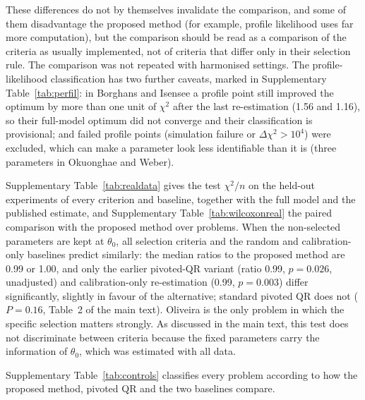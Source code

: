 These differences do not by themselves invalidate the comparison, and some of them disadvantage the proposed method (for example, profile likelihood uses far more computation), but the comparison should be read as a comparison of the criteria as usually implemented, not of criteria that differ only in their selection rule. The comparison was not repeated with harmonised settings. The profile-likelihood classification has two further caveats, marked in Supplementary Table~\ref{tab:perfil}: in Borghans and Isensee a profile point still improved the optimum by more than one unit of $\chi^2$ after the last re-estimation (1.56 and 1.16), so their full-model optimum did not converge and their classification is provisional; and failed profile points (simulation failure or $\Delta\chi^2>10^4$) were excluded, which can make a parameter look less identifiable than it is (three parameters in Okuonghae and Weber).

{\scriptsize\setlength{\tabcolsep}{3pt}

}


Supplementary Table~\ref{tab:realdata} gives the test $\chi^2/n$ on the held-out experiments of every criterion and baseline, together with the full model and the published estimate, and Supplementary Table~\ref{tab:wilcoxonreal} the paired comparison with the proposed method over problems. When the non-selected parameters are kept at $\theta_0$, all selection criteria and the random and calibration-only baselines predict similarly: the median ratios to the proposed method are 0.99 or 1.00, and only the earlier pivoted-QR variant (ratio 0.99, $p=0.026$, unadjusted) and calibration-only re-estimation (0.99, $p=0.003$) differ significantly, slightly in favour of the alternative; standard pivoted QR does not ($P=0.16$, Table~2 of the main text). Oliveira is the only problem in which the specific selection matters strongly. As discussed in the main text, this test does not discriminate between criteria because the fixed parameters carry the information of $\theta_0$, which was estimated with all data.

{\scriptsize\setlength{\tabcolsep}{3pt}

}

{\small

}

Supplementary Table~\ref{tab:controls} classifies every problem according to how the proposed method, pivoted QR and the two baselines compare.

